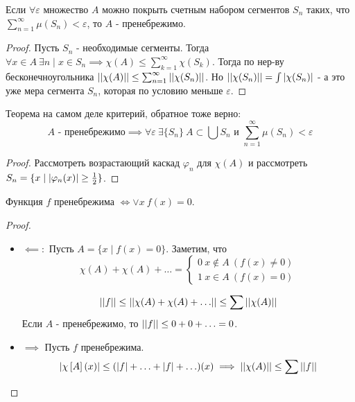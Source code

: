 \begin{theorem*}
    Если $\forall \varepsilon$ множество $A$ можно покрыть счетным набором сегментов $S_n$ таких, что $\sum_{n=1}^{\infty} \mu(S_n) < \varepsilon$, то $A$ - пренебрежимо.
    \begin{proof}
        Пусть $S_n$ - необходимые сегменты. Тогда $\forall x \in A \ \exists n \mid x \in S_n \implies \chi(A) \le \sum_{k=1}^{\infty} \chi(S_k)$. Тогда по нер-ву бесконечноугольника $\left| \left|  \chi(A) \right| \right| \le \sum_{n=1}^{\infty} \left| \left|  \chi(S_n) \right| \right|$. 
        Но $\left| \left|  \chi(S_n) \right| \right| = \int \left| \chi(S_n) \right|$ - а это уже мера сегмента $S_n$, которая по условию меньше $\varepsilon$.
    \end{proof}
        Теорема на самом деле критерий, обратное тоже верно:
        \[A \text{ - пренебрежимо} \implies \forall \varepsilon \ \exists \{S_n\} \ A \subset \bigcup S_n \text{ и } \sum_{n=1}^{\infty} \mu(S_n) < \varepsilon\]
    \begin{proof}
        Рассмотреть возрастающий каскад $\varphi_n$ для $\chi(A)$ и \newline рассмотреть $S_n = \{x \mid \left| \varphi_n(x) \right| \ge \frac{1}{2}\}$.
    \end{proof}
\end{theorem*}

\begin{theorem*}
    Функция $f$ пренебрежима $\iff \vee x \ f(x) = 0$.
    \begin{proof}
        \begin{itemize}
            \item $\impliedby:$ Пусть $A = \{x \mid f(x) = 0\}$. Заметим, что 
            \[\chi(A) + \chi(A) + \hdots = \begin{cases*}
                0 \ x \notin A \ (f(x) \neq 0) \\
                1 \ x \in A \ (f(x) = 0)
            \end{cases*}\] 

            \[\left| \left|  f \right| \right| \le \left| \left|  \chi(A) + \chi(A) + \hdots \right| \right| \le \sum \left| \left|  \chi(A) \right| \right|\]
            Если $A$ - пренебрежимо, то $\left| \left|  f \right| \right| \le 0 + 0 + \hdots = 0$.
            \item $\implies$ Пусть $f$ пренебрежима. 
            \[\left| \chi\left[A\right](x) \right| \le (\left| f \right| + \hdots + \left| f \right| + \hdots)(x) \implies \left| \left|  \chi(A) \right| \right| \le \sum \left| \left|  f \right| \right|\]
        \end{itemize}
    \end{proof}
\end{theorem*}


